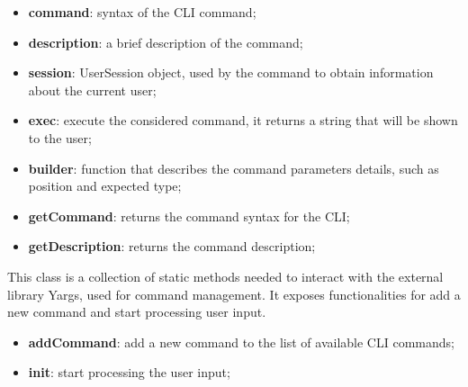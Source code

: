 					\begin{itemize}
						\item \textbf{command}: syntax of the CLI command;
						\item \textbf{description}: a brief description of the command;
						\item \textbf{session}: UserSession object, used by the command to obtain information about the current user; 
					\end{itemize}
				
					\begin{itemize}
						\item \textbf{exec}: execute the considered command, it returns a string that will be shown to the user;
						\item \textbf{builder}: function that describes the command parameters details, such as position and expected type;
						\item \textbf{getCommand}: returns the command syntax for the CLI;
						\item \textbf{getDescription}: returns the command description;
					\end{itemize}
	
			This class is a collection of static methods needed to interact with the external library Yargs, used for command management. It exposes functionalities for add a new command and start processing user input. 
					\begin{itemize}
						\item \textbf{addCommand}: add a new command to the list of available CLI commands;
						\item \textbf{init}: start processing the user input;
					\end{itemize}
			
